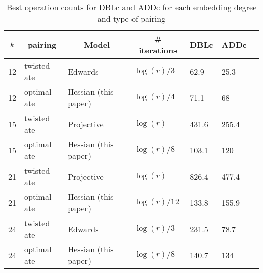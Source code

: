 \begin{table}[h]
\centering
\caption{Best operation counts for DBLc and ADDc for each embedding degree and type of pairing}

\begin{tabular}{|l| l| l| l| l| l| l|}
\hline
\multicolumn{1}{|c|}{$k$}
&\multicolumn{1}{|c|}{pairing} 
&\multicolumn{1}{|c|}{Model}
&\multicolumn{1}{|c|}{\# iterations}
&\multicolumn{1}{|c|}{DBLc}	
&\multicolumn{1}{|c|}{ADDc}	
\\
\hline
12 & twisted ate & Edwards~\cite{2014/LWZ} & $\log(r)/3$ &
62.9 & 25.3 \\
12 & optimal ate & Hessian (this paper) & $\log(r)/4$ &
71.1 & 68 \\
\hline
15 & twisted ate & Projective~\cite{2009/craig} & $\log(r)$ &
431.6 & 255.4 \\
15 & optimal ate & Hessian (this paper) & $\log(r)/8$ &
103.1 & 120 \\
\hline
21 & twisted ate & Projective~\cite{2009/craig} & $\log(r)$ &
826.4 & 477.4 \\
21 & optimal ate & Hessian (this paper) & $\log(r)/12$ &
133.8 & 155.9 \\
\hline
24 & twisted ate & Edwards~\cite{2014/LWZ} & $\log(r)/3$ &
231.5 & 78.7 \\
24 & optimal ate & Hessian (this paper) & $\log(r)/8$ &
140.7 & 134 \\ \hline
\end{tabular}
\label{tbl-cmp1}
\end{table}


